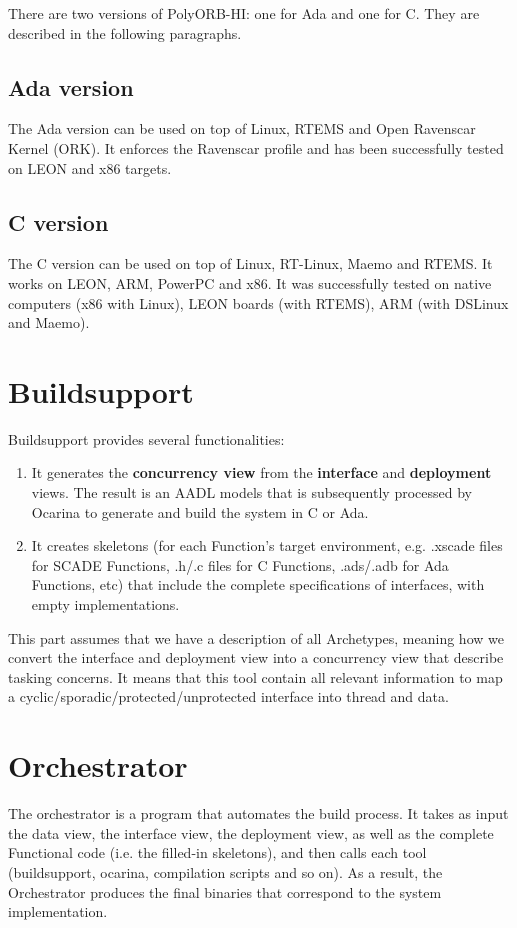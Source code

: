 \documentclass[11pt]{book}
\newcommand{\Concept}[1]{#1\xspace}
\newcommand{\aadl}{\Concept{AADL}}
\newcommand{\boxfixme}[1]{%
\begin{center}
\fbox{%
   \begin{minipage}{0.5\textwidth}
   \centering{\textbf{!!! FIXME !!!}}
   \rule{\linewidth}{0.5pt}
   #1
   \end{minipage}%
}
\end{center}
}
\begin{document}
   There are two versions of PolyORB-HI: one for Ada and one for C. They are
   described in the following paragraphs.

      \subsection{Ada version}
      The Ada version can be used on top of Linux, RTEMS and Open Ravenscar
      Kernel (ORK). It enforces the Ravenscar profile and has been successfully
      tested on LEON and x86 targets.

      \subsection{C version}
      The C version can be used on top of Linux, RT-Linux, Maemo and RTEMS. It
      works on LEON, ARM, PowerPC and x86. It was successfully tested on native
      computers (x86 with Linux), LEON boards (with RTEMS), ARM (with DSLinux
      and Maemo).

   \section{Buildsupport}
   \label{section-buildsupport}
   Buildsupport provides several functionalities:
   \begin{enumerate}
      \item
         It generates the \textbf{concurrency view}
         from the \textbf{interface} and \textbf{deployment} views. The result is
         an \aadl models that is subsequently processed by Ocarina to generate and build the
         system in C or Ada.
      \item
         It creates skeletons (for each Function's target environment, e.g. .xscade files 
         for SCADE Functions, .h/.c files for C Functions, .ads/.adb for Ada Functions, etc)
         that include the complete specifications of interfaces, with empty implementations.
   \end{enumerate}
   
   This part assumes that we have a description of all Archetypes, meaning how we convert the interface and
   deployment view into a concurrency view that describe tasking concerns. It
   means that this tool contain all relevant information to map a
   cyclic/sporadic/protected/unprotected interface into thread and data.


   \boxfixme{TO BE COMPLETED BY MAXIME}

   \section{Orchestrator}
   The orchestrator is a program that automates the build process. It
   takes as input the data view, the interface view, the deployment view, as well
   as the complete Functional code (i.e. the filled-in skeletons), and then
   calls each tool (buildsupport, ocarina, compilation scripts and so on). As a
   result, the Orchestrator produces the final binaries that correspond to the
   system implementation.
\end{document}
